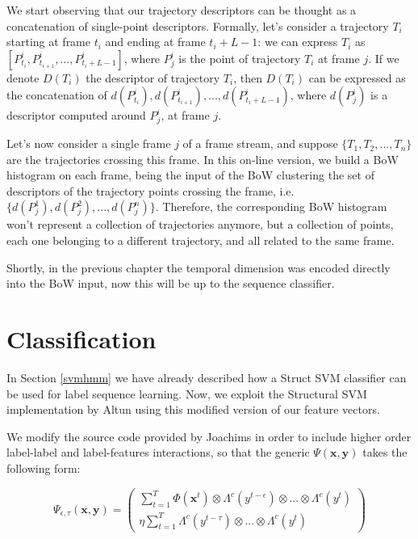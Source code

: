 We start observing that our trajectory descriptors can be thought as a concatenation of single-point descriptors. Formally, let's consider a trajectory $T_i$ starting at frame $t_i$ and ending at frame $t_i+L-1$: we can express $T_i$ as $\left[ P_{t_i}^i, P_{t_{i+1}}^i, ..., P_{t_i+L-1}^i \right]$, where $P_{j}^i$ is the point of trajectory $T_i$ at frame $j$.  If we denote $D(T_i)$ the descriptor of trajectory $T_i$, then $D(T_i)$ can be expressed as the concatenation of $d(P_{t_i}^i), d(P_{t_{i+1}}^i), ..., d( P_{t_i+L-1}^i)$, where $d(P_{j}^i)$ is a descriptor computed around $P_j^i$, at frame $j$. 

Let's now consider a single frame $j$ of a frame stream, and suppose $ \{ T_1, T_2, ..., T_n\}$ are the trajectories crossing this frame. In this on-line version, we build a BoW histogram on each frame, being the input of the BoW clustering the set of descriptors of the trajectory points crossing the frame, i.e. $\{ d(P_{j}^1),  d(P_{j}^2), ...,  d(P_{j}^n) \}$.  Therefore, the corresponding BoW histogram won't represent a collection of trajectories anymore, but a collection of points, each one belonging to a different trajectory, and all related to the same frame.

Shortly, in the previous chapter the temporal dimension was encoded directly into the BoW input, now this will be up to the sequence classifier.


\section{Classification}
 In Section \ref{svmhmm} we have already described how a Struct SVM classifier can be used for label sequence learning. Now, we exploit the Structural SVM implementation by Altun \etal \cite{altun2003hidden} using this modified version of our feature vectors.

 We modify the source code provided by Joachims \cite{joachims} in order to include higher order label-label and label-features interactions, so that the generic 
$\Psi(\mathbf{x},\mathbf{y})$ takes the following form:

\begin{equation}
\Psi_{\epsilon,\tau}(\mathbf{x},\mathbf{y}) = \left( \begin{array}{cc} \sum_{t=1}^T \Phi(\mathbf{x}^t) \otimes  \Lambda^c(y^{t-\epsilon}) \otimes ... \otimes \Lambda^c(y^t) \\ \eta\sum_{t=1}^{T}  \Lambda^c(y^{t-\tau}) \otimes ... \otimes \Lambda^c(y^t) \end{array} \right)
\end{equation}


